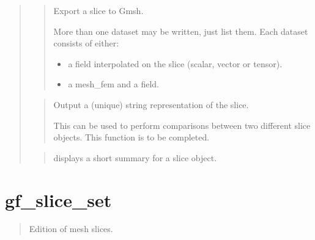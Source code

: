 \documentclass[a4paper,11pt,english]{sphinxmanual}
\begin{document}
\begin{quote}
\begin{quote}
\sphinxAtStartPar
Export a slice to Gmsh.

\sphinxAtStartPar
More than one dataset may be written, just list them.
Each dataset consists of either:
\begin{itemize}
\item {} 
\sphinxAtStartPar
a field interpolated on the slice (scalar, vector or tensor).

\item {} 
\sphinxAtStartPar
a mesh\_fem and a field.

\end{itemize}
\end{quote}

\sphinxAtStartPar
{}
\begin{quote}

\sphinxAtStartPar
Output a (unique) string representation of the slice.

\sphinxAtStartPar
This can be used to perform comparisons between two
different slice objects.
This function is to be completed.
\end{quote}

\sphinxAtStartPar
{}
\begin{quote}

\sphinxAtStartPar
displays a short summary for a slice object.
\end{quote}
\end{quote}


\section{gf\_slice\_set}
\label{\detokenize{matlab_octave/cmdref_gf_slice_set:gf-slice-set}}\label{\detokenize{matlab_octave/cmdref_gf_slice_set::doc}}
\sphinxAtStartPar
{}

\begin{sphinxVerbatim}[commandchars=\\\{\}]
    
\end{sphinxVerbatim}

\sphinxAtStartPar
{}
\begin{quote}

\sphinxAtStartPar
Edition of mesh slices.
\end{quote}
\end{document}
